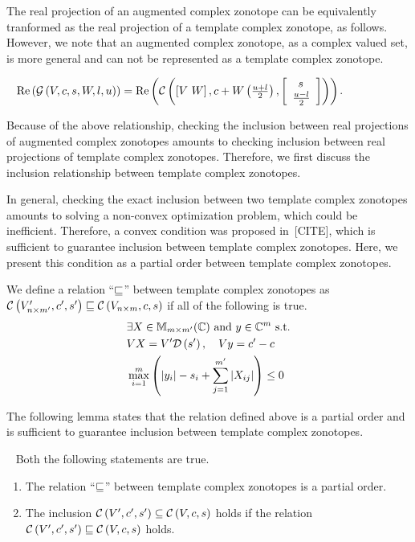 The real projection of an augmented complex zonotope can be
equivalently tranformed as the real projection of a template complex
zonotope, as follows.  However, we note that an augmented complex
zonotope, as a complex valued set, is more general and can not be represented as a
template complex zonotope.
%
\begin{lemma}~\label{lem:conversion}
$\real\lt(\gcz{V}{c}{s}{W}{l}{u}\rt) = \real\lt(\cz{\lt[V~W\rt]}{c+W\lt(\frac{u+l}{2}\rt)}{\ColumnJoin{\hspace{0.5em}s}{\frac{u-l}{2}}}\rt)$.
\end{lemma}
%
Because of the above relationship, checking the inclusion between real
projections of augmented complex zonotopes amounts to checking
inclusion between real projections of template complex zonotopes.
Therefore, we first discuss the inclusion relationship between
template complex zonotopes.

In general, checking the exact inclusion between two template complex
zonotopes amounts to solving a non-convex optimization problem, which
could be inefficient.  Therefore, a convex condition was proposed
in~[CITE], which is sufficient to guarantee inclusion between template
complex zonotopes.  Here, we present this condition as a
partial order between template complex zonotopes.

%
\begin{definition}
We define a relation ``$\order$'' between template complex zonotopes
as\\ $\cz{V^\pr_{n\times m^\pr}}{c^\pr}{s^\pr}\order \cz{V_{n\times
    m}}{c}{s}$ if all of the following is true.
\begin{align}
\begin{split}
& \exists X\in\mat{m}{m^\pr}{\mb{C}}~\text{and}~y\in\mb{C}^{m}~\text{s.t.}\\
& \transfer{V}{V^\pr}{s^\pr}{X},~~~\centertransfer{V}{c}{c^\pr}{y}\\
& \scalebound{X}{y}{s}{m}{m^\pr}\leq 0\\
\end{split}
\end{align}
\end{definition}
%
The following lemma states that the relation defined above is a partial
order and is sufficient to
guarantee inclusion between template complex zonotopes.

\begin{lemma}~\label{lem:zon-zon} Both the following statements are
  true.
\begin{enumerate}
\item The relation ``$\order$'' between template complex zonotopes is
  a partial order.
\item The inclusion $\cz{V^\pr}{c^\pr}{s^\pr}\subseteq
  \cz{V}{c}{s}$ holds if the
  relation\\ $\cz{{V^\pr}}{c^\pr}{s^\pr}\order
  \cz{V}{c}{s}$ holds.
\end{enumerate}
\end{lemma}

